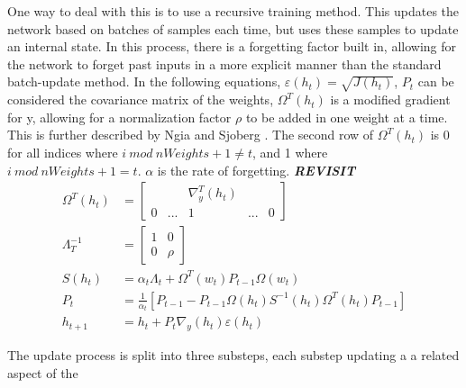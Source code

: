 \documentclass[11pt]{report}
\begin{document}
	\par One way to deal with this is to use a recursive training method. This updates the network based on batches of samples each time, but uses these samples to update an internal state. In this process, there is a forgetting factor built in, allowing for the network to forget past inputs in a more explicit manner than the standard batch-update method. In the following equations, $\varepsilon(h_t) = \sqrt{J(h_t)}$, $P_t$ can be considered the covariance matrix of the weights, $\Omega^T(h_t)$ is a modified gradient for y, allowing for a normalization factor $\rho$ to be added in one weight at a time. This is further described by Ngia and Sjoberg \cite{bg:rlm_establish}. The second row of $\Omega^T(h_t)$ is 0 for all indices where $i\ mod\ nWeights+1 \neq t$, and 1 where $i\ mod\ nWeights+1 = t$. $\alpha$ is the rate of forgetting. 
	\textbf{\textit{REVISIT}}
	\begin{align}
		\Omega^T(h_t) &= \begin{bmatrix}
			&& \nabla_y^T(h_t) && \\ 0 & ... & 1 & ... & 0
		\end{bmatrix} \\
		\Lambda_{T}^{-1} &= \begin{bmatrix}
			1&0\\0&\rho
		\end{bmatrix} \\
		S(h_t) &= \alpha_t\Lambda_t + \Omega^T(w_t)P_{t-1}\Omega(w_t) \\
		P_t &= \frac{1}{\alpha_t}[P_{t-1}-P_{t-1}\Omega(h_t)S^{-1}(h_t)\Omega^T(h_t)P_{t-1}]\\
		h_{t+1} &= h_t + P_t \nabla_y(h_t)\varepsilon(h_t) 
	\end{align}
	\par The update process is split into three substeps, each substep updating a a related aspect of the 
\end{document}
